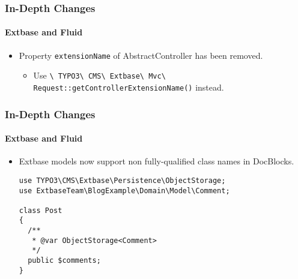 \begin{frame}[fragile]
	\frametitle{In-Depth Changes}
	\framesubtitle{Extbase and Fluid}

	\begin{itemize}
		\item Property \texttt{extensionName} of AbstractController has been removed.

			\begin{itemize}\smaller
				\item[\ding{228}] Use \texttt{\textbackslash
					TYPO3\textbackslash
					CMS\textbackslash
					Extbase\textbackslash
					Mvc\textbackslash
					Request::getControllerExtensionName()} instead.
			\end{itemize}\normalsize

	\end{itemize}

\end{frame}


\begin{frame}[fragile]
	\frametitle{In-Depth Changes}
	\framesubtitle{Extbase and Fluid}

	\lstset{basicstyle=\tiny\ttfamily}

	\begin{itemize}
		\item Extbase models now support non fully-qualified class names in DocBlocks.
\begin{lstlisting}
use TYPO3\CMS\Extbase\Persistence\ObjectStorage;
use ExtbaseTeam\BlogExample\Domain\Model\Comment;

class Post
{
  /**
   * @var ObjectStorage<Comment>
   */
  public $comments;
}
\end{lstlisting}

	\end{itemize}

\end{frame}


